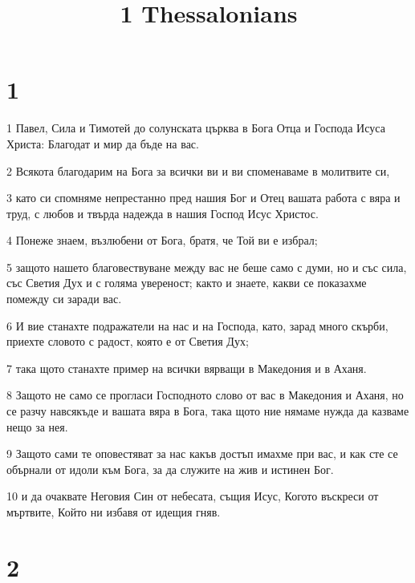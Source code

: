 

\title{1 Thessalonians}


\chapter{1}

\par 1 Павел, Сила и Тимотей до солунската църква в Бога Отца и Господа Исуса Христа: Благодат и мир да бъде на вас.
\par 2 Всякота благодарим на Бога за всички ви и ви споменаваме в молитвите си,
\par 3 като си спомняме непрестанно пред нашия Бог и Отец вашата работа с вяра и труд, с любов и твърда надежда в нашия Господ Исус Христос.
\par 4 Понеже знаем, възлюбени от Бога, братя, че Той ви е избрал;
\par 5 защото нашето благовествуване между вас не беше само с думи, но и със сила, със Светия Дух и с голяма увереност; както и знаете, какви се показахме помежду си заради вас.
\par 6 И вие станахте подражатели на нас и на Господа, като, зарад много скърби, приехте словото с радост, която е от Светия Дух;
\par 7 така щото станахте пример на всички вярващи в Македония и в Аханя.
\par 8 Защото не само се прогласи Господното слово от вас в Македония и Аханя, но се разчу навсякъде и вашата вяра в Бога, така щото ние нямаме нужда да казваме нещо за нея.
\par 9 Защото сами те оповестяват за нас какъв достъп имахме при вас, и как сте се обърнали от идоли към Бога, за да служите на жив и истинен Бог.
\par 10 и да очаквате Неговия Син от небесата, същия Исус, Когото въскреси от мъртвите, Който ни избавя от идещия гняв.

\chapter{2}

